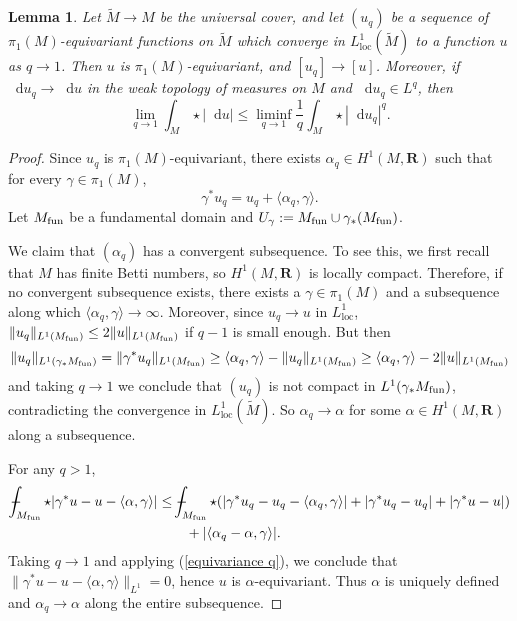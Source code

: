 \documentclass[reqno,11pt]{amsart}
\newcommand{\RR}{\mathbf{R}}
\newcommand*\dif{\mathop{}\!\mathrm{d}}
\newcommand{\loc}{\mathrm{loc}}
\newtheorem{lemma}[theorem]{Lemma}
\theoremstyle{definition}
\numberwithin{equation}{section}
\def\Xint#1{\mathchoice
{\XXint\displaystyle\textstyle{#1}}%
{\XXint\textstyle\scriptstyle{#1}}%
{\XXint\scriptstyle\scriptscriptstyle{#1}}%
{\XXint\scriptscriptstyle\scriptscriptstyle{#1}}%
\!\int}
\def\XXint#1#2#3{{\setbox0=\hbox{$#1{#2#3}{\int}$ }
\vcenter{\hbox{$#2#3$ }}\kern-.6\wd0}}
\def\dashint{\Xint-}
\begin{document}
\begin{lemma}\label{L1 convergence preserves pi1}
Let $\tilde M \to M$ be the universal cover, and let $(u_q)$ be a sequence of $\pi_1(M)$-equivariant functions on $\tilde M$ which converge in $L^1_\loc(\tilde M)$ to a function $u$ as $q \to 1$.
Then $u$ is $\pi_1(M)$-equivariant, and $[u_q] \to [u]$.
Moreover, if $\dif u_q \to \dif u$ in the weak topology of measures on $M$ and $\dif u_q \in L^q$, then
\begin{equation}\label{q to 1 Holder}
\lim_{q \to 1} \int_M \star |\dif u| \leq \liminf_{q \to 1} \frac{1}{q} \int_M \star |\dif u_q|^q.
\end{equation}
\end{lemma}
\begin{proof}
Since $u_q$ is $\pi_1(M)$-equivariant, there exists $\alpha_q \in H^1(M, \RR)$ such that for every $\gamma \in \pi_1(M)$,
\begin{equation}\label{equivariance q}
	\gamma^* u_q = u_q + \langle \alpha_q, \gamma\rangle.
\end{equation}
Let $M_{\rm fun}$ be a fundamental domain and $U_\gamma := M_{\rm fun} \cup \gamma_* (M_{\rm fun})$.

We claim that $(\alpha_q)$ has a convergent subsequence.
To see this, we first recall that $M$ has finite Betti numbers, so $H^1(M, \RR)$ is locally compact.
Therefore, if no convergent subsequence exists, there exists a $\gamma \in \pi_1(M)$ and a subsequence along which $\langle \alpha_q, \gamma\rangle \to \infty$.
Moreover, since $u_q \to u$ in $L^1_\loc$, $\|u_q\|_{L^1(M_{\rm fun})} \leq 2\|u\|_{L^1(M_{\rm fun})}$ if $q - 1$ is small enough.
But then 
$$\|u_q\|_{L^1(\gamma_* M_{\rm fun})} = \|\gamma^* u_q\|_{L^1(M_{\rm fun})} \geq \langle \alpha_q, \gamma\rangle - \|u_q\|_{L^1(M_{\rm fun})} \geq \langle \alpha_q, \gamma\rangle - 2\|u\|_{L^1(M_{\rm fun})}$$
and taking $q \to 1$ we conclude that $(u_q)$ is not compact in $L^1(\gamma_* M_{\rm fun})$, contradicting the convergence in $L^1_\loc(\tilde M)$.
So $\alpha_q \to \alpha$ for some $\alpha \in H^1(M, \RR)$ along a subsequence.

For any $q > 1$,
\begin{align*}
\dashint_{M_{\rm fun}} \star |\gamma^* u - u - \langle \alpha, \gamma\rangle| 
&\leq \dashint_{M_{\rm fun}} \star (|\gamma^* u_q - u_q - \langle \alpha_q, \gamma\rangle| + |\gamma^* u_q - u_q| + |\gamma^* u - u|) \\
&\qquad + |\langle \alpha_q - \alpha, \gamma\rangle|.
\end{align*}
Taking $q \to 1$ and applying (\ref{equivariance q}), we conclude that $\|\gamma^* u - u - \langle \alpha, \gamma\rangle\|_{L^1} = 0$, hence $u$ is $\alpha$-equivariant.
Thus $\alpha$ is uniquely defined and $\alpha_q \to \alpha$ along the entire subsequence.


\end{proof}
\end{document}
